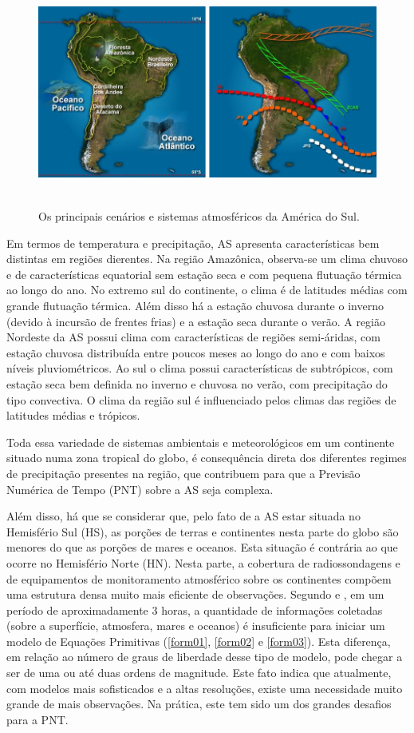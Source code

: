 \begin{figure}
\centering
\includegraphics[height=7.5cm]{./figs/fig02.png}
\caption{Os principais cenários e sistemas atmosféricos da América do Sul.}
\label{fig02}
\end{figure}

Em termos de temperatura e precipitação, AS apresenta características bem distintas em regiões dierentes. Na região Amazônica, observa-se um clima chuvoso e de características equatorial sem estação seca e com pequena flutuação térmica ao longo do ano. No extremo sul do continente, o clima é de latitudes médias com grande flutuação térmica. Além disso há a estação chuvosa durante o inverno (devido à incursão de frentes frias) e a estação seca durante o verão. A região Nordeste da AS possui clima com características de regiões semi-áridas, com estação chuvosa distribuída entre poucos meses ao longo do ano e com baixos níveis pluviométricos. Ao sul o clima possui características de subtrópicos, com estação seca bem definida no inverno e chuvosa no verão, com precipitação do tipo convectiva. O clima da região sul é influenciado pelos climas das regiões de latitudes médias e trópicos.

Toda essa variedade de sistemas ambientais e meteorológicos em um continente situado numa zona tropical do globo, é consequência direta dos diferentes regimes de precipitação presentes na região, que contribuem para que a Previsão Numérica de Tempo (PNT) sobre a AS seja complexa.

Além disso, há que se considerar que, pelo fato de a AS estar situada no Hemisfério Sul (HS), as porções de terras e continentes nesta parte do globo são menores do que as porções de mares e oceanos. Esta situação é contrária ao que ocorre no Hemisfério Norte (HN). Nesta parte, a cobertura de radiossondagens e de equipamentos de monitoramento atmosférico sobre os continentes compõem uma estrutura densa muito mais eficiente de observações. Segundo \cite{morel1980} e \cite{kalnay2003}, em um período de aproximadamente 3 horas, a quantidade de informações coletadas (sobre a superfície, atmosfera, mares e oceanos) é insuficiente para iniciar um modelo de Equações Primitivas (\autoref{form01}, \autoref{form02} e \autoref{form03}). Esta diferença, em relação ao número de graus de liberdade desse tipo de modelo, pode chegar a ser de uma ou até duas ordens de magnitude. Este fato indica que atualmente, com modelos mais sofisticados e a altas resoluções, existe uma necessidade muito grande de mais observações. Na prática, este tem sido um dos grandes desafios para a PNT. 

